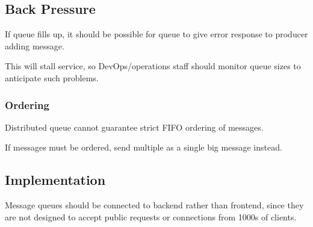 \documentclass[11pt]{article}
\begin{document}
\subsection{Back Pressure}
\label{sec:org5365318}
If queue fills up, it should be possible for queue to give error response to
producer adding message.

This will stall service, so DevOps/operations staff should monitor queue sizes
to anticipate such problems.
\subsubsection{Ordering}
\label{sec:orgf218434}
Distributed queue cannot guarantee strict FIFO ordering of messages.

If messages must be ordered, send multiple as a single big message instead.
\subsection{Implementation}
\label{sec:org52fdbc1}
Message queues should be connected to backend rather than frontend, since they
are not designed to accept public requests or connections from 1000s of clients.
\end{document}
